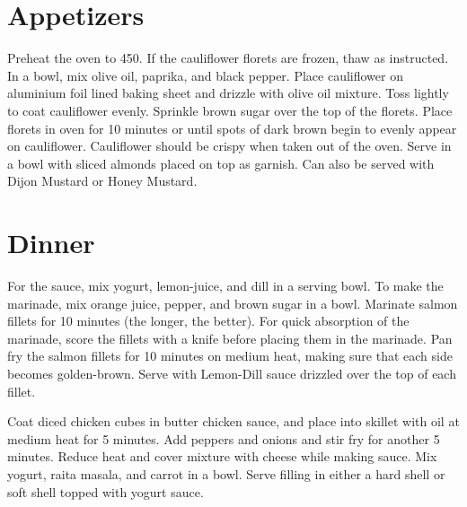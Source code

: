 \documentclass[oneside]{recipe}
\begin{document}
\chapter{Appetizers}
Preheat the oven to 450. If the cauliflower florets are frozen, thaw as instructed. In a bowl, mix olive oil, paprika, and black pepper. Place cauliflower on aluminium foil lined baking sheet and drizzle with olive oil mixture. Toss lightly to coat cauliflower evenly. Sprinkle brown sugar over the top of the florets. Place florets in oven for 10 minutes or until spots of dark brown begin to evenly appear on cauliflower. Cauliflower should be crispy when taken out of the oven. Serve in a bowl with sliced almonds placed on top as garnish. Can also be served with Dijon Mustard or Honey Mustard.

\chapter{Dinner}

For the sauce, mix yogurt, lemon-juice, and dill in a serving bowl. 
To make the marinade, mix orange juice, pepper, and brown sugar in a bowl. Marinate salmon fillets for 10 minutes (the longer, the better). For quick absorption of the marinade, score the fillets with a knife before placing them in the marinade. 
Pan fry the salmon fillets for 10 minutes on medium heat, making sure that each side becomes golden-brown. Serve with Lemon-Dill sauce drizzled over the top of each fillet. 


Coat diced chicken cubes in butter chicken sauce, and place into skillet with oil at medium heat for 5 minutes. Add peppers and onions and stir fry for another 5 minutes. Reduce heat and cover mixture with cheese while making sauce.
Mix yogurt, raita masala, and carrot in a bowl. Serve filling in either a hard shell or soft shell topped with yogurt sauce. 
\end{document}
